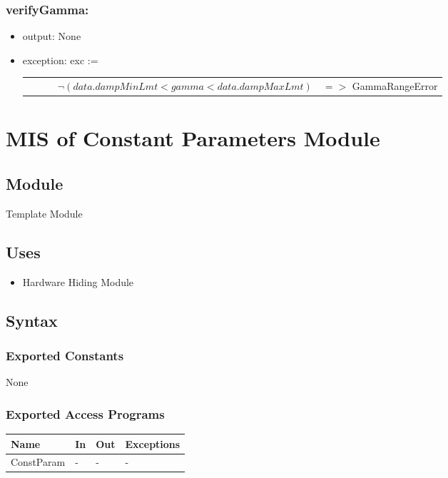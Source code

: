 \documentclass[12pt, titlepage]{article}
\begin{document}
	
	\subsubsection*{verifyGamma:} \begin{itemize} \item output: None \item
		exception: exc :=  \noindent \begin{longtable*}[l]{l l} \ \ \ \ \ \ $\neg
			(data.dampMinLmt <  gamma < data.dampMaxLmt)$ & $=>$ GammaRangeError\\
		\end{longtable*}
		
	\end{itemize}
	
	
	\newpage %
	\section{MIS of Constant Parameters Module} \label{CPM}
	
	
	\subsection{Module}
	Template Module
	
	\subsection{Uses} \begin{itemize} \item Hardware Hiding Module
	\end{itemize}
	
	\subsection{Syntax}
	
	\subsubsection{Exported Constants}
	
	None 
	
	\subsubsection{Exported Access Programs}
	
	\begin{center} \begin{tabular}{p{2cm} p{4cm} p{4cm} p{2cm}} \hline \textbf{Name}
			& \textbf{In} & \textbf{Out} & \textbf{Exceptions} \\ \hline ConstParam & - &
-
			& - \\ \hline \end{tabular} \end{center}
	
\end{document}
